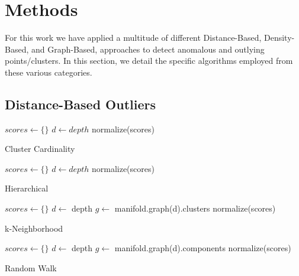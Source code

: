 \section{Methods}
\label{sec:methods}

For this work we have applied a multitude of different Distance-Based, Density-Based, and Graph-Based, approaches to detect anomalous and outlying points/clusters.
In this section, we detail the specific algorithms employed from these various categories.

\subsection{Distance-Based Outliers}

\begin{algorithm}
\DontPrintSemicolon
\SetAlgoLined
{}
 $scores \leftarrow \{\}$\;
 $d \leftarrow depth$\;
 normalize(scores)\;
 \caption{Cluster Cardinality}
 \label{alg-cc}
\end{algorithm}

\begin{algorithm}
\DontPrintSemicolon
\SetAlgoLined
{}
 $scores \leftarrow \{\}$\;
 $d \leftarrow depth$\;
 normalize(scores)\;
 \caption{Hierarchical}
 \label{alg-hierarchical}
\end{algorithm}


\begin{algorithm}
\DontPrintSemicolon
\SetAlgoLined
{}
 $scores \leftarrow \{\}$\;
 $d \leftarrow $ depth\;
 $g \leftarrow $ manifold.graph(d).clusters\;
 normalize(scores)\;
 \caption{k-Neighborhood}
 \label{alg-kneighborhood}
\end{algorithm}



\begin{algorithm}
\DontPrintSemicolon
\SetAlgoLined
{}
 $scores \leftarrow \{\}$\;
 $d \leftarrow $ depth\;
 $g \leftarrow $ manifold.graph(d).components\;
 normalize(scores)\;
 \caption{Random Walk}
 \label{alg-rw}
\end{algorithm}

